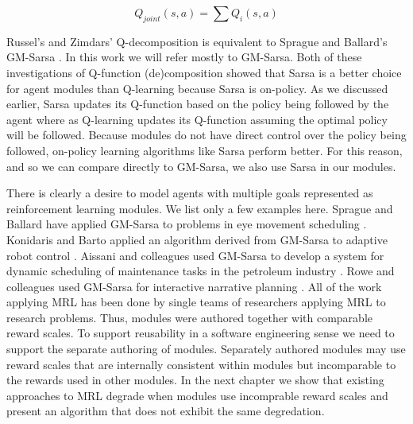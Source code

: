 \begin{equation}\label{eqn:joint-q}
  Q_{joint}(s, a) = \sum Q_i(s, a)
\end{equation}

Russel's and Zimdars' Q-decomposition \cite{russell2003q-decomposition} is equivalent to Sprague and Ballard's GM-Sarsa \cite{sprague2003multiple-goal}. In this work we will refer mostly to GM-Sarsa. Both of these investigations of Q-function (de)composition showed that Sarsa is a better choice for agent modules than Q-learning because Sarsa is on-policy. As we discussed earlier, Sarsa updates its Q-function based on the policy being followed by the agent where as Q-learning updates its Q-function assuming the optimal policy will be followed. Because modules do not have direct control over the policy being followed, on-policy learning algorithms like Sarsa perform better. For this reason, and so we can compare directly to GM-Sarsa, we also use Sarsa in our modules.

There is clearly a desire to model agents with multiple goals represented as reinforcement learning modules. We list only a few examples here. Sprague and Ballard have applied GM-Sarsa to problems in eye movement scheduling \cite{sprague2003eye,sprague2007modeling}. Konidaris and Barto applied an algorithm derived from GM-Sarsa to adaptive robot control \cite{konidaris2006adaptive}. Aissani and colleagues used GM-Sarsa to develop a system for dynamic scheduling of maintenance tasks in the petroleum industry \cite{aissani2009dynamic,chaari2014scheduling}. Rowe and colleagues used GM-Sarsa for interactive narrative planning \cite{rowe2013modular}. All of the work applying MRL has been done by single teams of researchers applying MRL to research problems. Thus, modules were authored together with comparable reward scales. To support reusability in a software engineering sense we need to support the separate authoring of modules. Separately authored modules may use reward scales that are internally consistent within modules but incomparable to the rewards used in other modules. In the next chapter we show that existing approaches to MRL degrade when modules use incomprable reward scales and present an algorithm that does not exhibit the same degredation.
